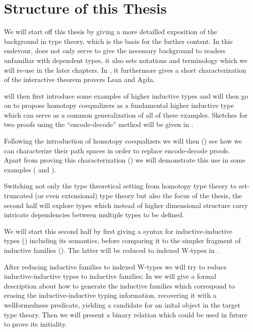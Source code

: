 \section{Structure of this Thesis}

We will start off this thesis by giving a more detailled exposition of the
background in type theory, which is the basis for the further content.
In this endevour,  does not only serve to give the necessary background
to readers unfamiliar with dependent types, it also sets notations and terminology
which we will re-use in the later chapters.
In , it furthermore gives a short characterization of the interactive
theorem pro\-vers Lean and Agda.

 will then first introduce some examples of higher inductive types
and will then go on to propose homotopy coequalizers as a fundamental higher
inductive type which can serve as a common generalization of all of these examples.
Sketches for two proofs using the ``encode-decode'' method will be given in
.

Following the introduction of homotopy coequalizers we will then ()
see how we can
characterize their path spaces in order to replace encode-decode proofs.
Apart from proving this characterization ()
we will demonstrate this use in some examples (
and ).

Switching not only the type theoretical setting from homotopy type theory
to set-truncated (or even extensional) type theory
but also the focus of the thesis, the second half will explore types which
instead of higher dimensional structure carry intricate dependencies between
multiple types to be defined.

We will start this second half by first giving a syntax for inductive-inductive
types () including its semantics,
before comparing it to the simpler fragment of inductive families ().
The latter will be reduced to indexed W-types in .

After reducing inductive families to indexed W-types we will try to reduce
inductive-inductive types to inductive families:
In  we will give a formal description about how to generate the
inductive families which correspond to
erasing the inductive-inductive typing information,
recovering it with a wellformedness predicate, yielding a candidate for an inital
object in the target type theory.
Then we will present a binary relation which could be used in future to prove
its initiality.










